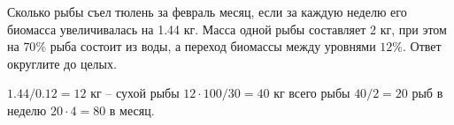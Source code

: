 
Сколько рыбы съел тюлень за февраль месяц, если за каждую неделю его
биомасса увеличивалась на 1.44 кг.  Масса
одной рыбы составляет 2 кг, при этом на $70\%$ рыба состоит из воды, а переход
биомассы между уровнями $12\%$. Ответ округлите до целых.

\solutionSection

$1.44/0.12=12$ кг – сухой рыбы $12 \cdot 100/30=40$ кг всего рыбы $40/2=20$ рыб в неделю $20 \cdot 4 = 80$ в месяц.

